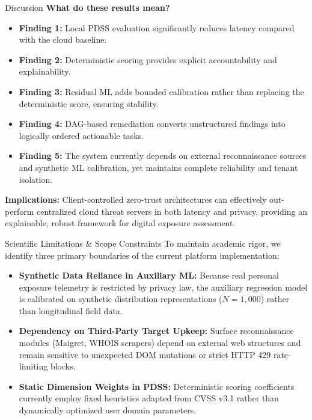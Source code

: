 \documentclass[aspectratio=169,10pt]{beamer}
\begin{document}
\begin{frame}{Discussion}
  \small
  \textbf{What do these results mean?}
  \vspace{0.15cm}
  \begin{itemize}\setlength{\itemsep}{0.20cm}
    \item \textbf{Finding 1:} Local PDSS evaluation significantly reduces latency compared with the cloud baseline.
    \item \textbf{Finding 2:} Deterministic scoring provides explicit accountability and explainability.
    \item \textbf{Finding 3:} Residual ML adds bounded calibration rather than replacing the deterministic score, ensuring stability.
    \item \textbf{Finding 4:} DAG-based remediation converts unstructured findings into logically ordered actionable tasks.
    \item \textbf{Finding 5:} The system currently depends on external reconnaissance sources and synthetic ML calibration, yet maintains complete reliability and tenant isolation.
  \end{itemize}
  \vspace{0.15cm}
  \textbf{Implications:} Client-controlled zero-trust architectures can effectively out-perform centralized cloud threat servers in both latency and privacy, providing an explainable, robust framework for digital exposure assessment.
\end{frame}

\begin{frame}{Scientific Limitations \& Scope Constraints}
  \normalsize
  To maintain academic rigor, we identify three primary boundaries of the current platform implementation:
  
  \vspace{0.25cm}
  \begin{itemize}\setlength{\itemsep}{0.40cm}
    \item \textbf{Synthetic Data Reliance in Auxiliary ML:} Because real personal exposure telemetry is restricted by privacy law, the auxiliary regression model is calibrated on synthetic distribution representations ($N=1,000$) rather than longitudinal field data.
    \item \textbf{Dependency on Third-Party Target Upkeep:} Surface reconnaissance modules (Maigret, WHOIS scrapers) depend on external web structures and remain sensitive to unexpected DOM mutations or strict HTTP 429 rate-limiting blocks.
    \item \textbf{Static Dimension Weights in PDSS:} Deterministic scoring coefficients currently employ fixed heuristics adapted from CVSS v3.1 rather than dynamically optimized user domain parameters.
  \end{itemize}
\end{frame}
\end{document}
